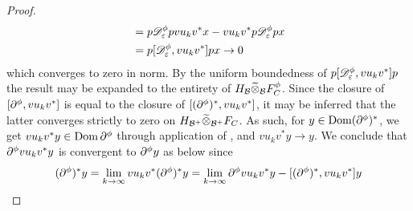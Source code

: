 \begin{proof}
\begin{align*}
		&=p\D^\phi_\epsilon pvu_kv^* x-vu_kv^*p\D^\phi_\epsilon px \\
		&=p[\D^\phi_\epsilon,vu_kv^*]px\to 0
	\end{align*}
	which converges to zero in norm. By the uniform boundedness of $p[\D^\phi_\epsilon,vu_kv^*]p$ the result may be expanded to the entirety of $H_{\B}\optens_{\B} F_C^\phi$. Since the closure of $[\part^\phi,vu_k v^*]$ is equal to the closure of $[(\part^\phi)^*,vu_kv^*]$, it may be inferred that the latter converges strictly to zero on $H_{\mathcal{B}^+}\widetilde{\otimes}_{\mathcal{B}^+} F_C$. As such, for $y\in \dom (\part^\phi)^*$, we get $vu_kv^* y\in \dom \part^\phi$ through application of , and $vu_kv^* y\to y$. We conclude that $\part^\phi vu_k v^* y$ is convergent to $\part^\phi y$ as below since
	\begin{align*}
		(\part^\phi)^*y&=\lim_{k\to\infty} vu_kv^* (\part^\phi)^*y=\lim_{k\to \infty} \part^\phi vu_k v^* y-[(\part^\phi)^*,vu_k v^*]y \\

\end{align*}
\end{proof}
